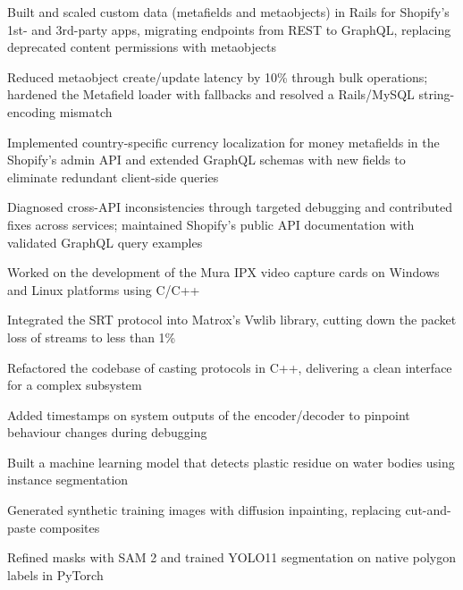 \vspace{\betweenentry}
\begin{points}
  \item Built and scaled custom data (metafields and metaobjects) in Rails for Shopify’s 1st- and 3rd-party apps, migrating endpoints from REST to GraphQL, replacing deprecated content permissions with metaobjects
  \item Reduced metaobject create/update latency by 10\% through bulk operations; hardened the Metafield loader with fallbacks and resolved a Rails/MySQL string-encoding mismatch
  \item Implemented country-specific currency localization for money metafields in the Shopify's admin API and extended GraphQL schemas with new fields to eliminate redundant client-side queries
  \item Diagnosed cross-API inconsistencies through targeted debugging and contributed fixes across services; maintained Shopify’s public API documentation with validated GraphQL query examples
\end{points}

\vspace{\betweenentry}
\begin{points}
  \item Worked on the development of the Mura IPX video capture cards on Windows and Linux platforms using C/C++
  \item Integrated the SRT protocol into Matrox's Vwlib library, cutting down the packet loss of streams to less than 1\%
  \item Refactored the codebase of casting protocols in C++, delivering a clean interface for a complex subsystem
  \item Added timestamps on system outputs of the encoder/decoder to pinpoint behaviour changes during debugging
\end{points}


\begin{points}
  \item Built a machine learning model that detects plastic residue on water bodies using instance segmentation
  \item Generated synthetic training images with diffusion inpainting, replacing cut-and-paste composites
  \item Refined masks with SAM 2 and trained YOLO11 segmentation on native polygon labels in PyTorch
\end{points}

